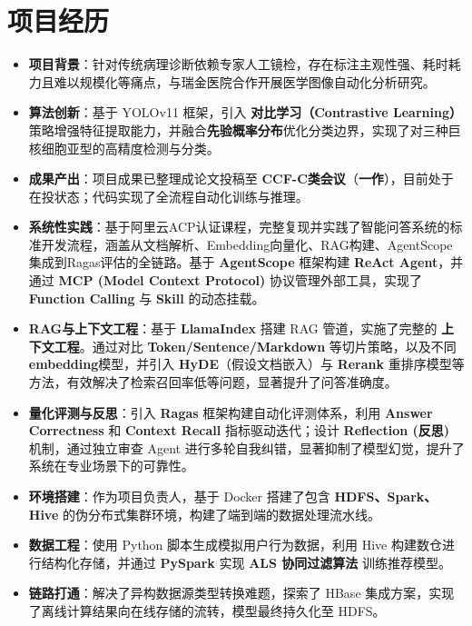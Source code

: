 \documentclass{resume}
\begin{document}

\section{项目经历}

\begin{itemize}
    \item \textbf{项目背景}：针对传统病理诊断依赖专家人工镜检，存在标注主观性强、耗时耗力且难以规模化等痛点，与瑞金医院合作开展医学图像自动化分析研究。
    \item \textbf{算法创新}：基于 YOLOv11 框架，引入 \textbf{对比学习（Contrastive Learning）} 策略增强特征提取能力，并融合\textbf{先验概率分布}优化分类边界，实现了对三种巨核细胞亚型的高精度检测与分类。
    \item \textbf{成果产出}：项目成果已整理成论文投稿至 \textbf{CCF-C类会议}（\textbf{一作}），目前处于在投状态；代码实现了全流程自动化训练与推理。
\end{itemize}

\begin{itemize}
    \item \textbf{系统性实践}：基于阿里云ACP认证课程，完整复现并实践了智能问答系统的标准开发流程，涵盖从文档解析、Embedding向量化、RAG构建、AgentScope集成到Ragas评估的全链路。基于 \textbf{AgentScope} 框架构建 \textbf{ReAct Agent}，并通过 \textbf{MCP (Model Context Protocol)} 协议管理外部工具，实现了 \textbf{Function Calling} 与 \textbf{Skill} 的动态挂载。
    \item \textbf{RAG与上下文工程}：基于 \textbf{LlamaIndex} 搭建 RAG 管道，实施了完整的 \textbf{上下文工程}。通过对比 \textbf{Token/Sentence/Markdown} 等切片策略，以及不同\textbf{embedding}模型，并引入 \textbf{HyDE}（假设文档嵌入）与 \textbf{Rerank} 重排序模型等方法，有效解决了检索召回率低等问题，显著提升了问答准确度。
    \item \textbf{量化评测与反思}：引入 \textbf{Ragas} 框架构建自动化评测体系，利用 \textbf{Answer Correctness} 和 \textbf{Context Recall} 指标驱动迭代；设计 \textbf{Reflection (反思)} 机制，通过独立审查 Agent 进行多轮自我纠错，显著抑制了模型幻觉，提升了系统在专业场景下的可靠性。
\end{itemize}

\begin{itemize}
    \item \textbf{环境搭建}：作为项目负责人，基于 Docker 搭建了包含 \textbf{HDFS、Spark、Hive} 的伪分布式集群环境，构建了端到端的数据处理流水线。
    \item \textbf{数据工程}：使用 Python 脚本生成模拟用户行为数据，利用 Hive 构建数仓进行结构化存储，并通过 \textbf{PySpark} 实现 \textbf{ALS 协同过滤算法} 训练推荐模型。
    \item \textbf{链路打通}：解决了异构数据源类型转换难题，探索了 HBase 集成方案，实现了离线计算结果向在线存储的流转，模型最终持久化至 HDFS。
\end{itemize}
\end{document}
